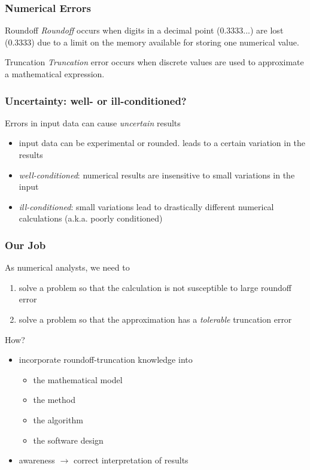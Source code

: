 \documentclass[10pt]{beamer}
\begin{document}
\begin{frame}
\frametitle{Numerical Errors}
\begin{block}{Roundoff}
\emph{Roundoff} occurs when digits in a decimal point (0.3333...) are lost
(0.3333) due to a limit on the memory available for storing one numerical
value.
\end{block}

\vspace{1.0cm}
\begin{block}{Truncation}
\emph{Truncation} error occurs when discrete values are used to
approximate a mathematical expression.
\end{block}
\end{frame}
\begin{frame}
\frametitle{Uncertainty: well- or ill-conditioned?}
\vspace{1.0cm}
Errors in input data can cause \emph{uncertain} results
\begin{itemize}
  \item input data can be experimental or rounded.  leads to a certain
  variation in the results
  \item \emph{well-conditioned}: numerical results are insensitive to small
  variations in the input
  \item \emph{ill-conditioned}: small variations lead to drastically different
  numerical calculations (a.k.a. poorly conditioned)
\end{itemize}
\end{frame}
\begin{frame}
\frametitle{Our Job}
As numerical analysts, we need to
\begin{enumerate}
  \item solve a problem so that the calculation is not susceptible to large
  roundoff error
  \item solve a problem so that the approximation has a \emph{tolerable}
  truncation error
\end{enumerate}

\vspace{1.0cm}
How?
\begin{itemize}
  \item incorporate roundoff-truncation knowledge into
  \begin{itemize}
    \item the mathematical model
    \item the method
    \item the algorithm
    \item the software design
  \end{itemize}
  \item awareness $\rightarrow$ correct interpretation of results
\end{itemize}
\end{frame}
\end{document}
